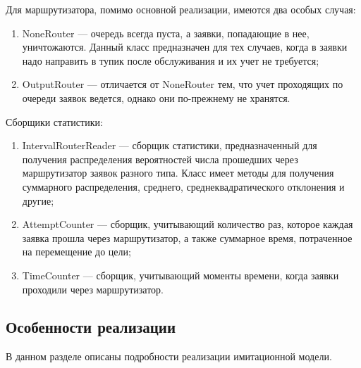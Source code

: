 Для маршрутизатора, помимо основной реализации, имеются два особых случая:
\begin{enumerate}
	\item NoneRouter --- очередь всегда пуста, а заявки, попадающие в нее, уничтожаются. Данный класс предназначен для тех случаев, когда в заявки надо направить в тупик после обслуживания и их учет не требуется;
	\item OutputRouter --- отличается от NoneRouter тем, что учет проходящих по очереди заявок ведется, однако они по-прежнему не хранятся.
\end{enumerate}

Сборщики статистики:
\begin{enumerate}
	\item IntervalRouterReader --- сборщик статистики, предназначенный для получения распределения вероятностей числа прошедших через маршрутизатор заявок разного типа. Класс имеет методы для получения суммарного распределения, среднего, среднеквадратического отклонения и другие;
	\item AttemptCounter --- сборщик, учитывающий количество раз, которое каждая заявка прошла через маршрутизатор, а также суммарное время, потраченное на перемещение до цели;
	\item TimeCounter --- сборщик, учитывающий моменты времени, когда заявки проходили через маршрутизатор.
\end{enumerate}

\subsection{Особенности реализации}
В данном разделе описаны подробности реализации имитационной модели.

